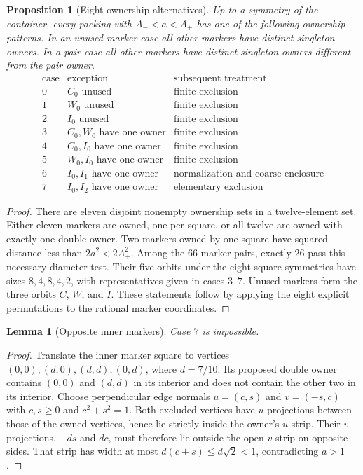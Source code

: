 \documentclass[11pt]{article}
\newtheorem{lemma}[theorem]{Lemma}
\newtheorem{proposition}[theorem]{Proposition}
\begin{document}
\begin{proposition}[Eight ownership alternatives]
\label{hybrid:eight-cases}
Up to a symmetry of the container, every packing with $A_-<a<A_+$ has
one of the following ownership patterns. In an unused-marker case all
other markers have distinct singleton owners. In a pair case all other
markers have distinct singleton owners different from the pair owner.
\[
\begin{array}{c|l|l}
\text{case}&\text{exception}&\text{subsequent treatment}\\ \hline
0&C_0\text{ unused}&\text{finite exclusion}\\
1&W_0\text{ unused}&\text{finite exclusion}\\
2&I_0\text{ unused}&\text{finite exclusion}\\
3&C_0,W_0\text{ have one owner}&\text{finite exclusion}\\
4&C_0,I_0\text{ have one owner}&\text{finite exclusion}\\
5&W_0,I_0\text{ have one owner}&\text{finite exclusion}\\
6&I_0,I_1\text{ have one owner}&\text{normalization and coarse enclosure}\\
7&I_0,I_2\text{ have one owner}&\text{elementary exclusion}
\end{array}
\]
\end{proposition}
\begin{proof}
There are eleven disjoint nonempty ownership sets in a twelve-element
set. Either eleven markers are owned, one per square, or all twelve
are owned with exactly one double owner. Two markers owned by one square
have squared distance less than $2a^2<2A_+^2$.
Among the $66$ marker pairs, exactly $26$ pass this necessary diameter
test. Their five orbits under the eight square symmetries have sizes
$8,4,8,4,2$, with representatives given in cases $3$--$7$.
Unused markers form the three orbits $C$, $W$, and $I$.
These statements follow by applying the eight explicit permutations to
the rational marker coordinates.
\end{proof}

\begin{lemma}[Opposite inner markers]
\label{hybrid:opposite-inner}
Case $7$ is impossible.
\end{lemma}
\begin{proof}
Translate the inner marker square to vertices $(0,0),(d,0),(d,d),(0,d)$,
where $d=7/10$. Its proposed double owner contains $(0,0)$ and $(d,d)$
in its interior and does not contain the other two in its interior.
Choose perpendicular edge normals $u=(c,s)$ and $v=(-s,c)$ with
$c,s\ge0$ and $c^2+s^2=1$. Both excluded vertices have $u$-projections
between those of the owned vertices, hence lie strictly inside the
owner's $u$-strip. Their $v$-projections, $-ds$ and $dc$, must therefore
lie outside the open $v$-strip on opposite sides. That strip has width
at most $d(c+s)\le d\sqrt2<1$, contradicting $a>1$.
\end{proof}
\end{document}

